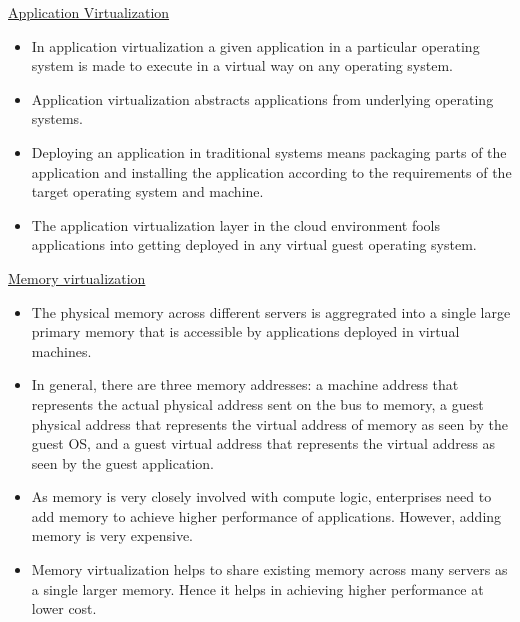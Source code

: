 \documentclass[a4paper, 12pt]{article}
\begin{document}
\underline{Application Virtualization}\\
\begin{itemize}
\item
In application virtualization a given application in a particular operating system is made to execute in a virtual way on any operating system.
\item
Application virtualization abstracts applications from underlying operating systems.
\item
Deploying an application in traditional systems means packaging parts of the application and installing the application according to the requirements of the target operating system and machine.
\item
The application virtualization layer in the cloud environment fools applications into getting deployed in any virtual guest operating system.
\end{itemize}

\underline{Memory virtualization}
\begin{itemize}
\item
The physical memory across different servers is aggregrated into a single large primary memory that is accessible by applications deployed in virtual machines.
\item
In general, there are three memory addresses: a machine address that represents the actual physical address sent on the bus to memory, a guest physical address that represents the virtual address of memory as seen by the guest OS, and a guest virtual address that represents the virtual address as seen by the guest application. 
\item
As memory is very closely involved with compute logic, enterprises need to add memory to achieve higher performance of applications. However, adding memory is very expensive.
\item
Memory virtualization helps to share existing memory across many servers as a single larger memory. Hence it helps in achieving higher performance at lower cost.
\end{itemize}
\end{document}
